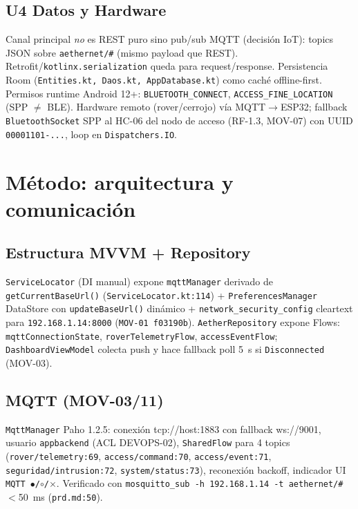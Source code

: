 \documentclass[conference]{IEEEtran}
\begin{document}
\subsection{U4 Datos y Hardware}
Canal principal \emph{no} es REST puro sino pub/sub MQTT (decisión IoT): topics JSON sobre \texttt{aethernet/\#} (mismo payload que REST). Retrofit/\texttt{kotlinx.serialization} queda para request/response. Persistencia Room (\texttt{Entities.kt, Daos.kt, AppDatabase.kt}) como caché offline-first. Permisos runtime Android 12+: \texttt{BLUETOOTH\_CONNECT}, \texttt{ACCESS\_FINE\_LOCATION} (SPP $\neq$ BLE). Hardware remoto (rover/cerrojo) vía MQTT$\rightarrow$ESP32; fallback \texttt{BluetoothSocket} SPP al HC-06 del nodo de acceso (RF-1.3, MOV-07) con UUID \texttt{00001101-...}, loop en \texttt{Dispatchers.IO}.

\section{Método: arquitectura y comunicación}
\subsection{Estructura MVVM + Repository}
\texttt{ServiceLocator} (DI manual) expone \texttt{mqttManager} derivado de \texttt{getCurrentBaseUrl()} (\texttt{ServiceLocator.kt:114}) + \texttt{PreferencesManager} DataStore con \texttt{updateBaseUrl()} dinámico + \texttt{network\_security\_config} cleartext para \texttt{192.168.1.14:8000} (\texttt{MOV-01 f03190b}). \texttt{AetherRepository} expone Flows: \texttt{mqttConnectionState}, \texttt{roverTelemetryFlow}, \texttt{accessEventFlow}; \texttt{DashboardViewModel} colecta push y hace fallback poll 5~s si \texttt{Disconnected} (MOV-03).

\subsection{MQTT (MOV-03/11)}
\texttt{MqttManager} Paho 1.2.5: conexión tcp://host:1883 con fallback ws://9001, usuario \texttt{appbackend} (ACL DEVOPS-02), \texttt{SharedFlow} para 4 topics (\texttt{rover/telemetry:69}, \texttt{access/command:70}, \texttt{access/event:71}, \texttt{seguridad/intrusion:72}, \texttt{system/status:73}), reconexión backoff, indicador UI \texttt{MQTT $\bullet$/$\circ$/$\times$}. Verificado con \texttt{mosquitto\_sub -h 192.168.1.14 -t aethernet/\#} $<$50~ms (\texttt{prd.md:50}).
\end{document}
